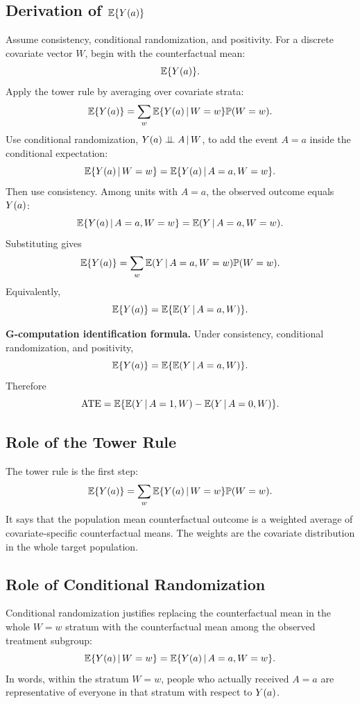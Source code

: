 \label{lec:3-6}

\subsection{Derivation of $\mathbb{E}\{Y(a)\}$}

Assume consistency, conditional randomization, and positivity. For a discrete covariate vector $W$, begin with the counterfactual mean:
\[
\mathbb{E}\{Y(a)\}.
\]
Apply the tower rule by averaging over covariate strata:
\[
\mathbb{E}\{Y(a)\}
=
\sum_w \mathbb{E}\{Y(a)\,\vert\, W=w\}\mathbb{P}(W=w).
\]
Use conditional randomization, $Y(a)\perp\!\!\!\perp A\,\vert\, W$, to add the event $A=a$ inside the conditional expectation:
\[
\mathbb{E}\{Y(a)\,\vert\, W=w\}
=
\mathbb{E}\{Y(a)\,\vert\, A=a,W=w\}.
\]
Then use consistency. Among units with $A=a$, the observed outcome equals $Y(a)$:
\[
\mathbb{E}\{Y(a)\,\vert\, A=a,W=w\}
=
\mathbb{E}(Y\,\vert\, A=a,W=w).
\]
Substituting gives
\[
\mathbb{E}\{Y(a)\}
=
\sum_w \mathbb{E}(Y\,\vert\, A=a,W=w)\mathbb{P}(W=w).
\]
Equivalently,
\[
\mathbb{E}\{Y(a)\}
=
\mathbb{E}\{\mathbb{E}(Y\,\vert\, A=a,W)\}.
\]

\begin{identificationbox}
\textbf{G-computation identification formula.} Under consistency, conditional randomization, and positivity,
\[
\mathbb{E}\{Y(a)\}
=
\mathbb{E}\{\mathbb{E}(Y\,\vert\, A=a,W)\}.
\]
Therefore
\[
\operatorname{ATE}
=
\mathbb{E}\{\mathbb{E}(Y\,\vert\, A=1,W)-\mathbb{E}(Y\,\vert\, A=0,W)\}.
\]
\end{identificationbox}

\subsection{Role of the Tower Rule}

The tower rule is the first step:
\[
\mathbb{E}\{Y(a)\}
=\sum_w \mathbb{E}\{Y(a)\,\vert\, W=w\}\mathbb{P}(W=w).
\]
It says that the population mean counterfactual outcome is a weighted average of covariate-specific counterfactual means. The weights are the covariate distribution in the whole target population.

\subsection{Role of Conditional Randomization}

Conditional randomization justifies replacing the counterfactual mean in the whole $W=w$ stratum with the counterfactual mean among the observed treatment subgroup:
\[
\mathbb{E}\{Y(a)\,\vert\, W=w\}
=
\mathbb{E}\{Y(a)\,\vert\, A=a,W=w\}.
\]
In words, within the stratum $W=w$, people who actually received $A=a$ are representative of everyone in that stratum with respect to $Y(a)$.

